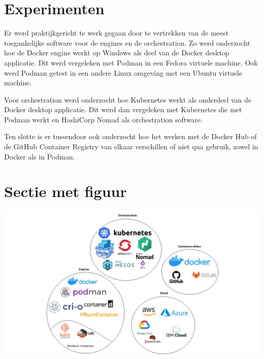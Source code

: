 \documentclass[a0,portrait]{a0poster}
\begin{document}
\begin{multicols}{2}
\color{Black} %
\color{HoGentAccent1} 
\section*{Experimenten}
\color{black}
Er werd praktijkgericht te werk gegaan door te vertrekken van de meest toegankelijke software voor de engines en de orchestration. Zo werd onderzocht hoe de Docker engine werkt op Windows als deel van de Docker desktop applicatie. Dit werd vergeleken met Podman in een Fedora virtuele machine. Ook werd Podman getest in een andere Linux omgeving met een Ubuntu virtuele machine.

Voor orchestration werd onderzocht hoe Kubernetes werkt als onderdeel van de Docker desktop applicatie. Dit werd dan vergeleken met Kubernetes die met Podman werkt en HashiCorp Nomad als orchestration software.

Ten slotte is er tussendoor ook onderzocht hoe het werken met de Docker Hub of de GitHub Container Registry van elkaar verschillen of niet qua gebruik, zowel in Docker als in Podman.

\color{HoGentAccent1} 
\section*{Sectie met figuur}
\color{black}


\begin{center}\vspace{1cm}
\includegraphics[width=1.0\linewidth]{software}
\end{center}\vspace{1cm}





\end{multicols}
\end{document}
